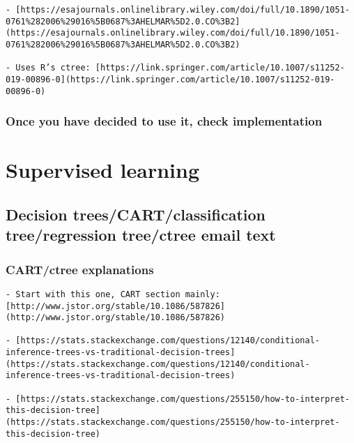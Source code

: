 \documentclass[
]{book}
\begin{document}
\begin{verbatim}
- [https://esajournals.onlinelibrary.wiley.com/doi/full/10.1890/1051-0761%282006%29016%5B0687%3AHELMAR%5D2.0.CO%3B2](https://esajournals.onlinelibrary.wiley.com/doi/full/10.1890/1051-0761%282006%29016%5B0687%3AHELMAR%5D2.0.CO%3B2)
    
- Uses R’s ctree: [https://link.springer.com/article/10.1007/s11252-019-00896-0](https://link.springer.com/article/10.1007/s11252-019-00896-0)
\end{verbatim}

\hypertarget{once-you-have-decided-to-use-it-check-implementation}{%
\subsection{Once you have decided to use it, check implementation}\label{once-you-have-decided-to-use-it-check-implementation}}

\hypertarget{supervised-learning}{%
\chapter*{Supervised learning}\label{supervised-learning}}

\hypertarget{decision-treescartclassification-treeregression-treectree-email-text}{%
\section{Decision trees/CART/classification tree/regression tree/ctree email text}\label{decision-treescartclassification-treeregression-treectree-email-text}}

\hypertarget{cartctree-explanations-1}{%
\subsection{CART/ctree explanations}\label{cartctree-explanations-1}}

\begin{verbatim}
- Start with this one, CART section mainly: [http://www.jstor.org/stable/10.1086/587826](http://www.jstor.org/stable/10.1086/587826)
    
- [https://stats.stackexchange.com/questions/12140/conditional-inference-trees-vs-traditional-decision-trees](https://stats.stackexchange.com/questions/12140/conditional-inference-trees-vs-traditional-decision-trees)
    
- [https://stats.stackexchange.com/questions/255150/how-to-interpret-this-decision-tree](https://stats.stackexchange.com/questions/255150/how-to-interpret-this-decision-tree)
    
\end{verbatim}
\end{document}
